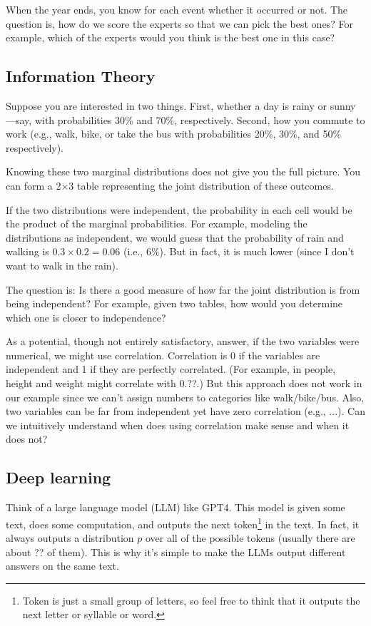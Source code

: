 \documentclass{article}
\begin{document}
When the year ends, you know for each event whether it occurred or not. The question is, how do we score the experts so that we can pick the best ones? For example, which of the experts would you think is the best one in this case? 


\subsection{Information Theory}

Suppose you are interested in two things. First, whether a day is rainy or sunny—say, with probabilities 30\% and 70\%, respectively. Second, how you commute to work (e.g., walk, bike, or take the bus with probabilities 20\%, 30\%, and 50\% respectively).

Knowing these two marginal distributions does not give you the full picture. You can form a 2$\times$3 table representing the joint distribution of these outcomes.

If the two distributions were independent, the probability in each cell would be the product of the marginal probabilities. For example, modeling the distributions as independent, we would guess that the probability of rain and walking is \(0.3\times0.2=0.06\) (i.e., 6\%). But in fact, it is much lower (since I don't want to walk in the rain).

The question is: Is there a good measure of how far the joint distribution is from being independent? For example, given two tables, how would you determine which one is closer to independence?

As a potential, though not entirely satisfactory, answer, if the two variables were numerical, we might use correlation. Correlation is 0 if the variables are independent and 1 if they are perfectly correlated. (For example, in people, height and weight might correlate with 0.??.) But this approach does not work in our example since we can't assign numbers to categories like walk/bike/bus. Also, two variables can be far from independent yet have zero correlation (e.g., ...). Can we intuitively understand when does using correlation make sense and when it does not? 

\subsection{Deep learning}

Think of a large language model (LLM) like GPT4. This model is given some text, does some computation, and outputs the next token\footnote{Token is just a small group of letters, so feel free to think that it outputs the next letter or syllable or word. } in the text. In fact, it always outputs a distribution $p$ over all of the possible tokens (usually there are about ?? of them). This is why it's simple to make the LLMs output different answers on the same text. 
\end{document}
